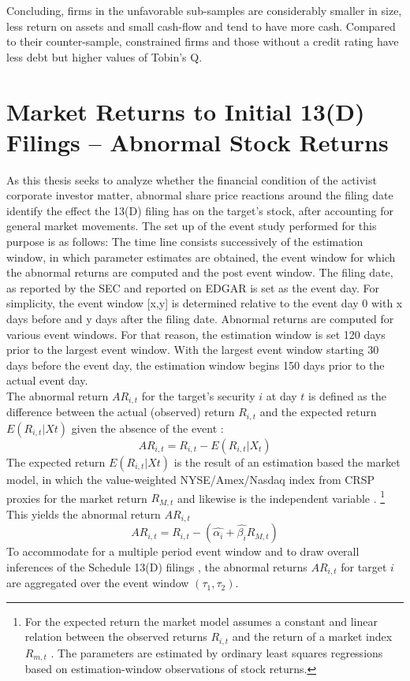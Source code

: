 \documentclass[12pt]{article}
\begin{document}
Concluding, firms in the unfavorable sub-samples are considerably smaller in size, less return on assets and small cash-flow and tend to have more cash. Compared to their counter-sample, constrained firms and those without a credit rating have less debt but higher values of Tobin's Q.


\section{Market Returns to Initial 13(D) Filings -- Abnormal Stock Returns}
As this thesis seeks to analyze whether the financial condition of the activist corporate investor matter, abnormal share price reactions around the filing date identify the effect the 13(D) filing has on the target's stock, after accounting for general market movements.
The set up of the event study performed for this purpose is as follows: The time line consists successively of the estimation window, in which parameter estimates are obtained, the event window for which the abnormal returns are computed and the post event window. 
The filing date, as reported by the SEC and reported on EDGAR is set as the event day. For simplicity, the event window [x,y] is determined relative to the event day 0 with x days before and y days after the filing date. Abnormal returns are computed for various event windows. For that reason, the estimation window is set 120 days prior to the largest event window. With the largest event window starting 30 days before the event day, the estimation window begins 150 days prior to the actual event day.\\
The abnormal return $AR_{i,t}$ for the target's security $i$ at day $t$ is defined as the difference between the actual (observed) return $R_{i,t}$ and the expected return $E(R_{i,t}|X{t})$ given the absence of the event \citep[p.15]{MacKinlay1997}:
	\begin{equation}\label{eq:1}
		AR_{i,t}=R_{i,t}-E(R_{i,t}|X_{t})
	\end{equation}
The expected return $E(R_{i,t}|X{t})$ is the result of an estimation based the market model, in which the value-weighted NYSE/Amex/Nasdaq index from CRSP proxies for the market return $R_{M,t}$ and likewise is the independent variable \citep[p.18]{MacKinlay1997}.
	\footnote{For the expected return the market model assumes a constant and linear relation between the observed returns $R_{i,t}$ and the return of a market index $R_{m,t}$ \citep[p.18]{MacKinlay1997}. The parameters are estimated by ordinary least squares regressions based on estimation-window observations of stock returns.}
This yields the abnormal return $AR_{i,t}$
	\begin{equation}\label{eq:2}
		AR_{i,t}=R_{i,t}-(\hat{\alpha_{i}}+\hat{\beta_{i}}R_{M,t})
	\end{equation}
To accommodate for a multiple period event window and to draw overall inferences of the Schedule 13(D) filings \citep[p.21]{MacKinlay1997}, the abnormal returns $AR_{i,t}$ for target $i$ are aggregated over the event window $(\tau_1,\tau_2)$. 
\end{document}
